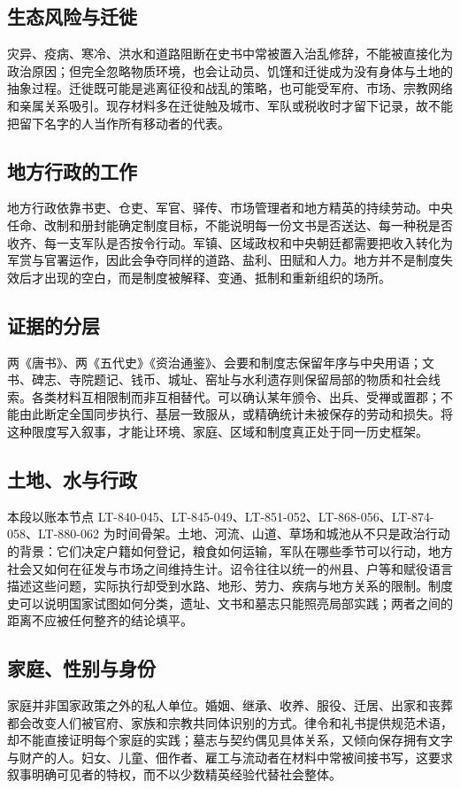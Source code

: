 \subsection{生态风险与迁徙}
灾异、疫病、寒冷、洪水和道路阻断在史书中常被置入治乱修辞，不能被直接化为政治原因；但完全忽略物质环境，也会让动员、饥馑和迁徙成为没有身体与土地的抽象过程。迁徙既可能是逃离征役和战乱的策略，也可能受军府、市场、宗教网络和亲属关系吸引。现存材料多在迁徙触及城市、军队或税收时才留下记录，故不能把留下名字的人当作所有移动者的代表。

\subsection{地方行政的工作}
地方行政依靠书吏、仓吏、军官、驿传、市场管理者和地方精英的持续劳动。中央任命、改制和册封能确定制度目标，不能说明每一份文书是否送达、每一种税是否收齐、每一支军队是否按令行动。军镇、区域政权和中央朝廷都需要把收入转化为军赏与官署运作，因此会争夺同样的道路、盐利、田赋和人力。地方并不是制度失效后才出现的空白，而是制度被解释、变通、抵制和重新组织的场所。

\subsection{证据的分层}
两《唐书》、两《五代史》《资治通鉴》、会要和制度志保留年序与中央用语；文书、碑志、寺院题记、钱币、城址、窑址与水利遗存则保留局部的物质和社会线索。各类材料互相限制而非互相替代。可以确认某年颁令、出兵、受禅或置郡；不能由此断定全国同步执行、基层一致服从，或精确统计未被保存的劳动和损失。将这种限度写入叙事，才能让环境、家庭、区域和制度真正处于同一历史框架。
\subsection{土地、水与行政}
本段以账本节点 LT-840-045、LT-845-049、LT-851-052、LT-868-056、LT-874-058、LT-880-062 为时间骨架。土地、河流、山道、草场和城池从不只是政治行动的背景：它们决定户籍如何登记，粮食如何运输，军队在哪些季节可以行动，地方社会又如何在征发与市场之间维持生计。诏令往往以统一的州县、户等和赋役语言描述这些问题，实际执行却受到水路、地形、劳力、疾病与地方关系的限制。制度史可以说明国家试图如何分类，遗址、文书和墓志只能照亮局部实践；两者之间的距离不应被任何整齐的结论填平。

\subsection{家庭、性别与身份}
家庭并非国家政策之外的私人单位。婚姻、继承、收养、服役、迁居、出家和丧葬都会改变人们被官府、家族和宗教共同体识别的方式。律令和礼书提供规范术语，却不能直接证明每个家庭的实践；墓志与契约偶见具体关系，又倾向保存拥有文字与财产的人。妇女、儿童、佃作者、雇工与流动者在材料中常被间接书写，这要求叙事明确可见者的特权，而不以少数精英经验代替社会整体。

